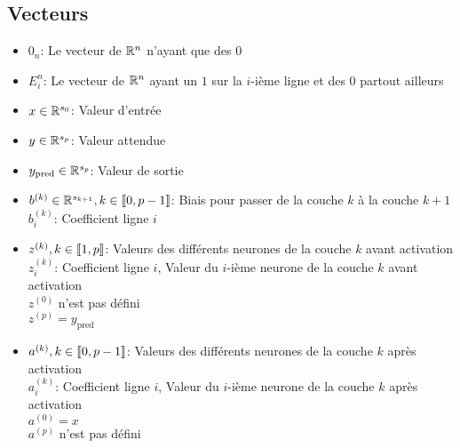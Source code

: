 \subsection{Vecteurs}
	\begin{itemize}
		\item $0_{n}$: Le vecteur de $\mathbb{R}^n$  n'ayant que des $0$\\
		\item $E^{n}_i$: Le vecteur de $\mathbb{R}^n$ ayant un $1$ sur la $i$-ième ligne et des $0$ partout ailleurs\\
		
		\item $x\in\mathbb{R}^{s_0}$: Valeur d'entrée\\
			
		\item $y\in\mathbb{R}^{s_p}$: Valeur attendue\\
		
		\item $y_\text{pred}\in\mathbb{R}^{s_p}$: Valeur de sortie\\
		
		\item $b^{(k)}\in\mathbb{R}^{s_{k+1}}, k\in\left\llbracket0, p-1\right\rrbracket$: Biais pour passer de la couche $k$ à la couche $k+1$\\
	        $b_i^{(k)}$: Coefficient ligne $i$\\
					
					
		\item $z^{(k)}, k\in\left\llbracket1, p\right\rrbracket$: Valeurs des différents neurones de la couche $k$ avant activation\\
		      $z_i^{(k)}$: Coefficient ligne $i$, Valeur du $i$-ième neurone de la couche $k$ avant activation\\
					$z^{(0)}$ n'est pas défini\\
					$z^{(p)} = y_\text{pred}$\\
					
		\item $a^{(k)}, k\in\left\llbracket0, p - 1\right\rrbracket$: Valeurs des différents neurones de la couche $k$ après activation\\
		      $a_i^{(k)}$: Coefficient ligne $i$, Valeur du $i$-ième neurone de la couche $k$ après activation\\
					$a^{(0)} = x$\\
					$a^{(p)}$ n'est pas défini\\
	\end{itemize}
	
